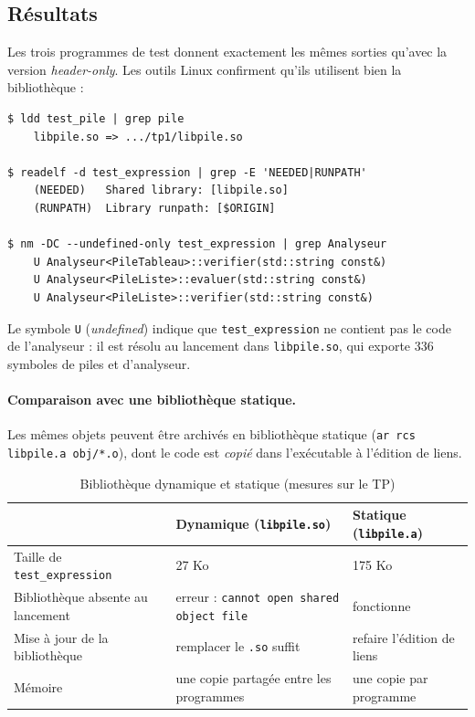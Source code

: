 \documentclass[11pt,a4paper]{article}
\newcommand{\code}[1]{\texttt{#1}}
\begin{document}
\subsection{Résultats}

Les trois programmes de test donnent exactement les mêmes sorties qu'avec la
version \emph{header-only}. Les outils Linux confirment qu'ils utilisent bien
la bibliothèque :

\begin{lstlisting}[style=sortie, caption={Vérification de la liaison dynamique}]
$ ldd test_pile | grep pile
    libpile.so => .../tp1/libpile.so

$ readelf -d test_expression | grep -E 'NEEDED|RUNPATH'
    (NEEDED)   Shared library: [libpile.so]
    (RUNPATH)  Library runpath: [$ORIGIN]

$ nm -DC --undefined-only test_expression | grep Analyseur
    U Analyseur<PileTableau>::verifier(std::string const&)
    U Analyseur<PileListe>::evaluer(std::string const&)
    U Analyseur<PileListe>::verifier(std::string const&)
\end{lstlisting}

Le symbole \code{U} (\emph{undefined}) indique que \code{test\_expression}
ne contient pas le code de l'analyseur : il est résolu au lancement dans
\code{libpile.so}, qui exporte 336 symboles de piles et d'analyseur.

\paragraph{Comparaison avec une bibliothèque statique.} Les mêmes objets
peuvent être archivés en bibliothèque statique (\code{ar rcs libpile.a
obj/*.o}), dont le code est \emph{copié} dans l'exécutable à l'édition de
liens.

\begin{table}[H]
\centering
\small
\begin{tabularx}{\linewidth}{l X X}
  \toprule
  & \textbf{Dynamique} (\code{libpile.so}) & \textbf{Statique} (\code{libpile.a}) \\
  \midrule
  Taille de \code{test\_expression} & 27 Ko & 175 Ko \\
  Bibliothèque absente au lancement & erreur : \code{cannot open shared object file} & fonctionne \\
  Mise à jour de la bibliothèque & remplacer le \code{.so} suffit & refaire l'édition de liens \\
  Mémoire & une copie partagée entre les programmes & une copie par programme \\
  \bottomrule
\end{tabularx}
\caption{Bibliothèque dynamique et statique (mesures sur le TP)}
\end{table}
\end{document}

